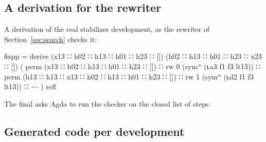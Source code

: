 \subsection{A derivation for the rewriter}\label{sec:rewriter-details}

A derivation of the real stabilizer development, as the rewriter of
Section~\ref{sec:search} checks it:
\begin{agdacode}
δxpp = derive (x13 ∷ h02 ∷ h13 ∷ h01 ∷ h23 ∷ []) (h02 ∷ h13 ∷ h01 ∷ h23 ∷ x23 ∷ [])
  ( perm (x13 ∷ h02 ∷ h13 ∷ h01 ∷ h23 ∷ [])
  ∷ rw 0 (sym⁼ (ʟa3 f1 f3 lt13))
  ∷ perm (h13 ∷ h13 ∷ x13 ∷ h02 ∷ h13 ∷ h01 ∷ h23 ∷ [])
  ∷ rw 1 (sym⁼ (ʟd2 f1 f3 lt13))
  ∷ ⋯ ) refl
\end{agdacode}
The final  asks Agda to run the checker on the closed list of
steps.

\subsection{Generated code per development}\label{sec:generated-details}

